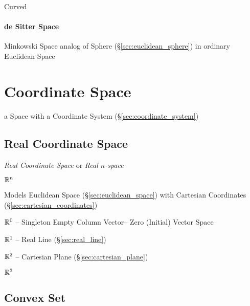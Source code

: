 Curved



\paragraph{de Sitter Space}\label{sec:desitter_space}\hfill

Minkowski Space analog of Sphere (\S\ref{sec:euclidean_sphere}) in ordinary
Euclidean Space



\section{Coordinate Space}\label{sec:coordinate_space}

a Space with a Coordinate System (\S\ref{sec:coordinate_system})



\subsection{Real Coordinate Space}\label{sec:real_coordinate_space}

\emph{Real Coordinate Space} or \emph{Real $n$-space}

$\mathbb{R}^n$

Models Euclidean Space (\S\ref{sec:euclidean_space}) with Cartesian
Coordinates (\S\ref{sec:cartesian_coordinates})

$\mathbb{R}^0$ -- Singleton Empty Column Vector-- Zero (Initial) Vector
Space

$\mathbb{R}^1$ -- Real Line (\S\ref{sec:real_line})

$\mathbb{R}^2$ -- Cartesian Plane (\S\ref{sec:cartesian_plane})

$\mathbb{R}^3$



\subsection{Convex Set}\label{sec:convex_set}


